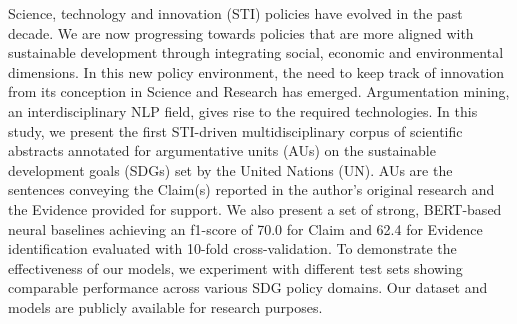 Science, technology and innovation (STI) policies have evolved in the past decade. We are now progressing towards policies that are more aligned with sustainable development through integrating social, economic and environmental dimensions. In this new policy environment, the need to keep track of innovation from its conception in Science and Research has emerged. Argumentation mining, an interdisciplinary NLP field, gives rise to the required technologies. In this study, we present the first STI-driven multidisciplinary corpus of scientific abstracts annotated for argumentative units (AUs) on the sustainable development goals (SDGs) set by the United Nations (UN). AUs are the sentences conveying the Claim(s) reported in the author's original research and the Evidence provided for support. We also present a set of strong, BERT-based neural baselines achieving an f1-score of 70.0 for Claim and 62.4 for Evidence identification evaluated with 10-fold cross-validation. To demonstrate the effectiveness of our models, we experiment with different test sets showing comparable performance across various SDG policy domains. Our dataset and models are publicly available for research purposes.
